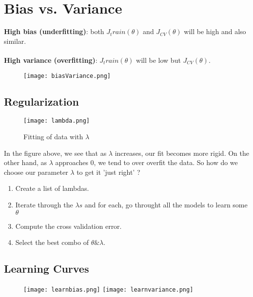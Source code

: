\section{Bias vs. Variance}
  \textbf{High bias (underfitting)}: both $J_train(\theta)$ and $J_{CV}(\theta)$ will be high and also similar.
  \\\\
  \textbf{High variance (overfitting)}: $J_train(\theta)$ will be low but $J_{CV}(\theta)$.\\

  \begin{figure}[h]
    \centering
    \texttt{[image: biasVariance.png]}
  \end{figure}

  \subsection{Regularization}

    \begin{figure}[h]
      \centering
      \texttt{[image: lambda.png]}
      \caption{Fitting of data with $\lambda$}
    \end{figure}

    In the figure above, we see that as $\lambda$ increases, our fit becomes more rigid. On the other hand, as $\lambda$ approaches 0, we tend to over overfit the data. So how do we choose our parameter $\lambda$ to get it 'just right' ?

    \begin{enumerate}
      \item Create a list of lambdas.
      \item Iterate through the $\lambda s$ and for each, go throught all the models to learn some $\theta$
      \item Compute the cross validation error.
      \item Select the best combo of $\theta \& \lambda$.
    \end{enumerate}    

  \subsection{Learning Curves}
    \begin{figure}[h]
      \centering
      \texttt{[image: learnbias.png]}
      \texttt{[image: learnvariance.png]}
    \end{figure}    
  
